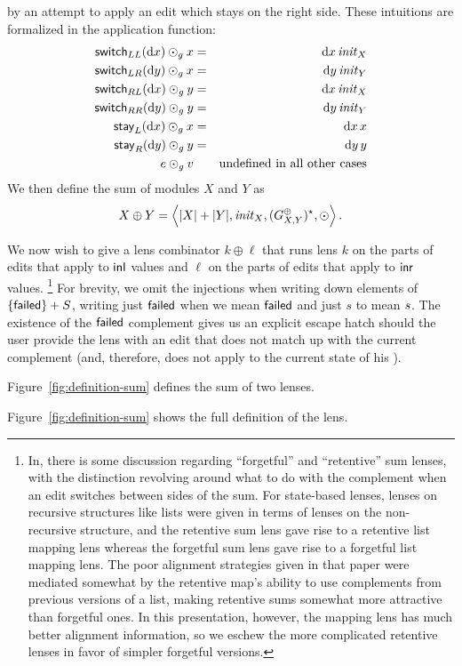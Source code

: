 by an attempt to apply an edit which stays on the right
side. These intuitions are formalized in the application function:
\begin{eqnarray*}
    \mathsf{switch}_{LL}(\textrm{d} x)\odot_g x &=& {\textrm{d} x\,\mathit{init}_X} \\
    \mathsf{switch}_{LR}(\textrm{d} y)\odot_g x &=& {\textrm{d} y\,\mathit{init}_Y} \\
    \mathsf{switch}_{RL}(\textrm{d} x)\odot_g y &=& {\textrm{d} x\,\mathit{init}_X} \\
    \mathsf{switch}_{RR}(\textrm{d} y)\odot_g y &=& {\textrm{d} y\,\mathit{init}_Y} \\
    \mathsf{stay}_L(\textrm{d} x)\odot_g x &=& {\textrm{d} x\,x} \\
    \mathsf{stay}_R(\textrm{d} y)\odot_g y &=& {\textrm{d} y\,y} \\
    e \odot_g v && \mbox{undefined in all other cases}
\end{eqnarray*}
We then define the sum of modules $X$ and $Y$ as
\[X \oplus Y =
\left<|X|+|Y|,\mlinl{\init_X},(G^\oplus_{X,Y})\LIST,\odot\right>.\]

We now wish to give a lens combinator $k\oplus\ell$ that runs lens $k$ on
the parts of edits that apply to $\mathsf{inl}$ values and $\ell$ on
the parts of edits that apply to $\mathsf{inr}$ values.%
\footnote{\label{footnoteseven}%
In\symmlenses, there is some discussion regarding
``forgetful'' and ``retentive'' sum lenses, with the distinction revolving
around what to do with the complement when an edit switches between sides of
the sum. For state-based lenses, lenses on recursive structures like lists
were given in terms of lenses on the non-recursive structure, and the
retentive sum lens gave rise to a retentive list mapping lens whereas the
forgetful sum lens gave rise to a forgetful list mapping lens. The poor
alignment strategies given in that paper were mediated somewhat by the
retentive map's ability to use complements from previous versions of a list,
making retentive sums somewhat more attractive than forgetful ones. In this
presentation, however, the mapping lens has much better alignment
information, so we eschew the more complicated retentive lenses in favor of
simpler forgetful versions.
}
\iffailed
For brevity, we omit the injections when writing down elements of
$\{\mathsf{failed}\}+S$, writing just $\mathsf{failed}$ when we mean $\mathsf{failed}$
and just $s$ to mean $ s$. The existence of the $\mathsf{failed}$ complement
gives us an explicit escape hatch should the user provide the lens with an
edit that does not match up with the current complement (and, therefore,
does not apply to the current state of his \replica). 
\fi
\iffull
\begin{defn}[Sum]
Figure~\ref{fig:definition-sum} defines the sum of two lenses. 
\end{defn}
\else
Figure~\ref{fig:definition-sum} shows the full definition of the lens.
\fi%

